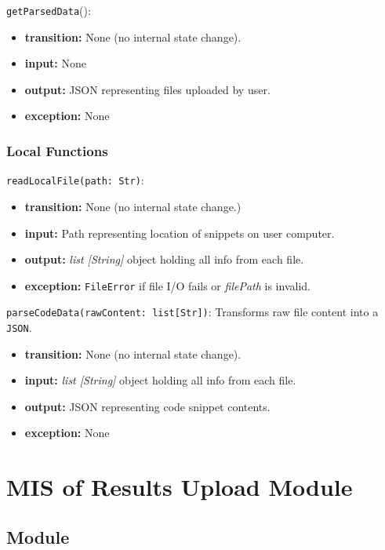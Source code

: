 \documentclass[12pt, titlepage]{article}
\begin{document}
\noindent \texttt{getParsedData}():
\begin{itemize}
    \item \textbf{transition:} None (no internal state change).
    \item \textbf{input:} None
    \item \textbf{output:} JSON representing files uploaded by user.
    \item \textbf{exception:} None
\end{itemize}

\subsubsection{Local Functions}

\noindent \texttt{readLocalFile(path: Str)}: 
\begin{itemize}
    \item \textbf{transition:} None (no internal state change.)
    \item \textbf{input:} Path representing location of snippets on user computer.
    \item \textbf{output:} \textit{list [String]} object holding all info from each
    file.
    \item \textbf{exception:} \texttt{FileError} if file I/O fails or \textit{filePath} is invalid.
\end{itemize}

\noindent \texttt{parseCodeData(rawContent: list[Str])}: Transforms raw file content into a \texttt{JSON}.
\begin{itemize}
    \item \textbf{transition:} None (no internal state change).
    \item \textbf{input:}  \textit{list [String]} object holding all info from each
    file.
    \item \textbf{output:} JSON representing code snippet contents.
    \item \textbf{exception:} None
\end{itemize}

\section{MIS of Results Upload Module} \label{mResultsUpload}

\subsection{Module} %
\end{document}

